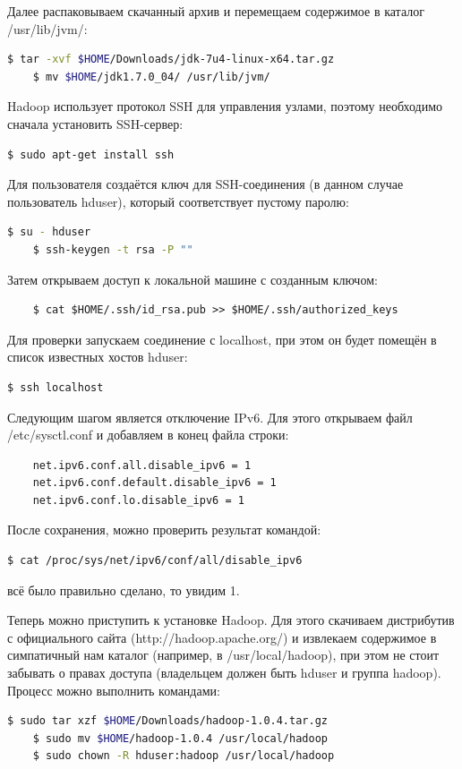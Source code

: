 \documentclass[12pt,a4paper]{extarticle} %
\begin{document}
\noindent Далее распаковываем скачанный архив и перемещаем содержимое в каталог /usr/lib/jvm/:
\begin{lstlisting}[language=sh]
    $ tar -xvf $HOME/Downloads/jdk-7u4-linux-x64.tar.gz
    $ mv $HOME/jdk1.7.0_04/ /usr/lib/jvm/
\end{lstlisting}

\noindent Hadoop использует протокол SSH для управления узлами, поэтому необходимо сначала установить SSH-сервер:
\begin{lstlisting}[language=sh]
    $ sudo apt-get install ssh
\end{lstlisting}

\noindent Для пользователя создаётся ключ для SSH-соединения (в данном случае пользователь hduser), который соответствует пустому паролю:
\begin{lstlisting}[language=sh]
    $ su - hduser
    $ ssh-keygen -t rsa -P ""
\end{lstlisting}

\noindent Затем открываем доступ к локальной машине с созданным ключом:
\begin{lstlisting}
    $ cat $HOME/.ssh/id_rsa.pub >> $HOME/.ssh/authorized_keys
\end{lstlisting}

\noindent Для проверки запускаем соединение с localhost, при этом он будет помещён в список известных хостов hduser:
\begin{lstlisting}[language=sh]
    $ ssh localhost
\end{lstlisting}

\noindent Следующим шагом является отключение IPv6. Для этого открываем файл /etc/sysctl.conf и добавляем в конец файла строки:
\begin{lstlisting}
    net.ipv6.conf.all.disable_ipv6 = 1
    net.ipv6.conf.default.disable_ipv6 = 1
    net.ipv6.conf.lo.disable_ipv6 = 1
\end{lstlisting}

\noindent После сохранения, можно проверить результат командой:
\begin{lstlisting}[language=sh]
    $ cat /proc/sys/net/ipv6/conf/all/disable_ipv6
\end{lstlisting}

     всё было правильно сделано, то увидим 1.

\noindent Теперь можно приступить  к установке Hadoop. Для этого скачиваем дистрибутив с официального сайта (http://hadoop.apache.org/)  и извлекаем содержимое в симпатичный нам каталог (например, в /usr/local/hadoop), при этом не стоит забывать о правах доступа (владельцем должен быть hduser и группа hadoop). Процесс можно выполнить командами:
\begin{lstlisting}[language=sh]
    $ sudo tar xzf $HOME/Downloads/hadoop-1.0.4.tar.gz
    $ sudo mv $HOME/hadoop-1.0.4 /usr/local/hadoop
    $ sudo chown -R hduser:hadoop /usr/local/hadoop
\end{lstlisting}
\end{document}
